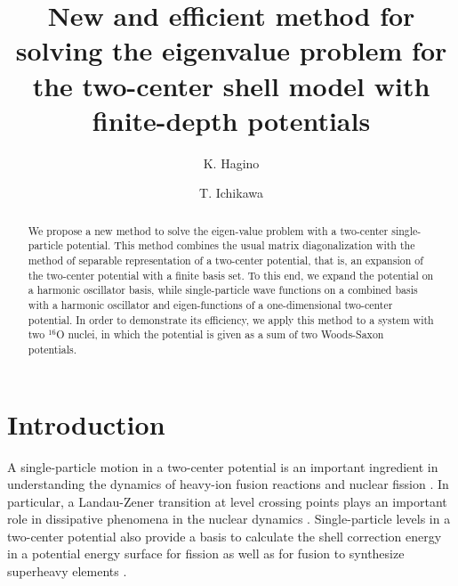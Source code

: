\documentclass[superscriptaddress,twocolumn,amsmath,amssymb]{revtex4}
\begin{document}
\title{New and efficient method for solving the eigenvalue problem 
for the 
two-center shell model with finite-depth potentials} 

\author{K. Hagino}

\author{T. Ichikawa}


\begin{abstract}
We propose a new method to solve the eigen-value problem with 
a two-center single-particle potential. 
This method combines 
the usual matrix diagonalization with 
the method of separable representation of 
a two-center potential, that 
is, an expansion of the two-center potential with a finite basis set. 
To this end, we expand the potential on a harmonic oscillator basis, 
while single-particle wave functions on a combined basis with a harmonic 
oscillator and eigen-functions of a one-dimensional two-center potential. 
In order to demonstrate its efficiency, we apply this method to a system with 
two $^{16}$O nuclei, in which the potential is given as a sum of two 
Woods-Saxon potentials. 
\end{abstract}

\maketitle

\section{Introduction}

A single-particle motion in a two-center potential 
\cite{GPS94,MG72,Gherghescu03} 
is an important 
ingredient in understanding the dynamics of heavy-ion fusion reactions 
and nuclear fission \cite{GM74,SW75,IM13,Diaz-Torres04,Diaz-Torres07}. 
In particular, 
a Landau-Zener transition at level 
crossing points plays an important role in dissipative phenomena 
in the nuclear dynamics \cite{GM74,SW75}. 
Single-particle levels in a two-center potential also provide a 
basis to calculate the shell correction energy in a potential energy 
surface for fission \cite{ICA14} as well as 
for fusion to synthesize superheavy elements \cite{ZG15}.  
\end{document}
